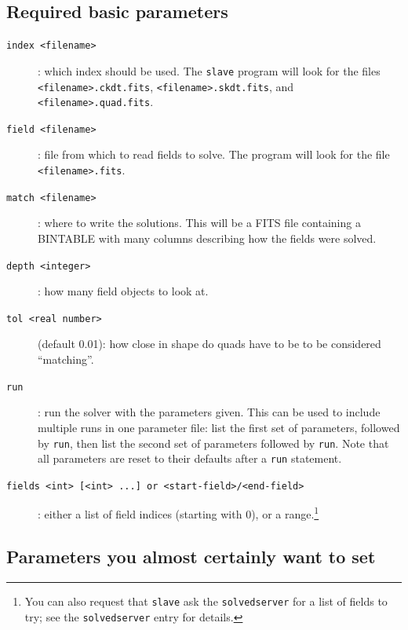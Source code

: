 \documentclass[12pt,letterpaper,titlepage]{article}
\newcommand{\code}[1]{\texttt{#1}}
\begin{document}
\subsection{Required basic parameters}
\begin{description}
\item[\code{index <filename>}]: which index should be used.  The
  \code{slave} program will look for the files \code{<filename>.ckdt.fits},
  \code{<filename>.skdt.fits}, and \code{<filename>.quad.fits}.
\item[\code{field <filename>}]: file from which to read fields to solve.
  The program will look for the file \code{<filename>.fits}.
\item[\code{match <filename>}]: where to write the solutions.  This will be
  a FITS file containing a BINTABLE with many columns describing how the
  fields were solved.
\item[\code{depth <integer>}]: how many field objects to look at.
\item[\code{tol <real number>}] (default 0.01): how close in shape do quads
  have to be to be considered ``matching''.
\item[\code{run}]: run the solver with the parameters given.  This can be
  used to include multiple runs in one parameter file: list the first set
  of parameters, followed by \code{run}, then list the second set of
  parameters followed by \code{run}.  Note that all parameters are reset
  to their defaults after a \code{run} statement.
\item[\code{fields <int> [<int> ...] or <start-field>/<end-field>}]:
  either a list of field indices (starting with 0), or a range.\footnote{%
	You can also request that \code{slave} ask the \code{solvedserver} for a
	list of fields to try; see the \code{solvedserver} entry for details.}
\end{description}

\subsection{Parameters you almost certainly want to set}
\end{document}
